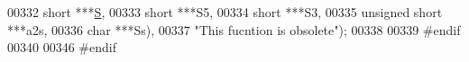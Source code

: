 \begin{DoxyCode}
00332                                       \textcolor{keywordtype}{short}           ***\mbox{\hyperlink{group__energy__parameters__rw_gga7bf2bb363bcf5ce50d60255d256e5682af1ce01387d2348f8b858721a7db81670}{S}},
00333                                       \textcolor{keywordtype}{short}           ***S5,
00334                                       \textcolor{keywordtype}{short}           ***S3,
00335                                       \textcolor{keywordtype}{unsigned} \textcolor{keywordtype}{short}  ***a2s,
00336                                       \textcolor{keywordtype}{char}            ***Ss),
00337           \textcolor{stringliteral}{"This fucntion is obsolete"});
00338 
00339 \textcolor{preprocessor}{#endif}
00340 
00346 \textcolor{preprocessor}{#endif}
\end{DoxyCode}
